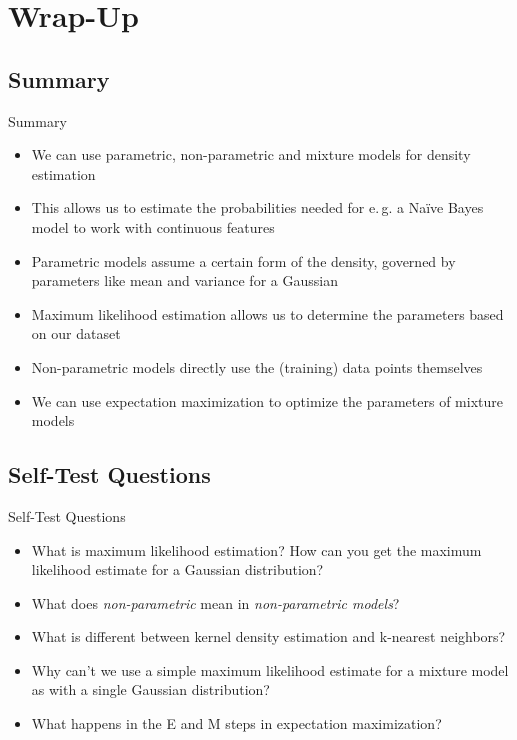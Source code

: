 \section{Wrap-Up}

\subsection{Summary}

\begin{frame}{Summary}{}
	\begin{itemize}
		\item We can use parametric, non-parametric and mixture models for density estimation
		\item This allows us to estimate the probabilities needed for e.\,g. a Na\"ive Bayes model to work with continuous features
		\item Parametric models assume a certain form of the density, governed by parameters like mean and variance for a Gaussian
		\item Maximum likelihood estimation allows us to determine the parameters based on our dataset
		\item Non-parametric models directly use the (training) data points themselves
		\item We can use expectation maximization to optimize the parameters of mixture models
	\end{itemize}
\end{frame}


\subsection{Self-Test Questions}

\begin{frame}{Self-Test Questions}{}\important
	\begin{itemize}
		\item What is maximum likelihood estimation? How can you get the maximum likelihood estimate for a Gaussian distribution?
		\item What does \textit{non-parametric} mean in \textit{non-parametric models}?
		\item What is different between kernel density estimation and k-nearest neighbors?
		\item Why can't we use a simple maximum likelihood estimate for a mixture model as with a single Gaussian distribution?
		\item What happens in the E and M steps in expectation maximization?
	\end{itemize}
\end{frame}


